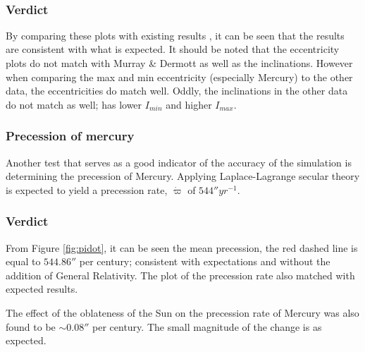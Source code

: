 \documentclass[11pt, oneside]{article}   	%
\begin{document}
\newpage
\ 
\newpage
\
\newpage

\subsubsection*{Verdict}

By comparing these plots with existing results \cite{ssd, texas}, it can be seen that the results are consistent with what is expected. It should be noted that the eccentricity plots do not match with Murray \& Dermott as well as the inclinations. However when comparing the max and min eccentricity (especially Mercury) to the other data\cite{texas}, the eccentricities do match well. Oddly, the inclinations in the other data\cite{texas} do not match as well; has lower $I_{min}$ and higher $I_{max}$.

\subsubsection{Precession of mercury}

Another test that serves as a good indicator of the accuracy of the simulation is determining the precession of Mercury. Applying Laplace-Lagrange secular theory is expected to yield a precession rate, $\dot{\varpi}$ of $544{}'' yr^{-1}$\cite{texas, PRMer}.

\subsubsection*{Verdict}

From Figure \ref{fig:pidot}, it can be seen the mean precession, the red dashed line is equal to $544.86{}''$ per century; consistent with expectations and without the addition of General Relativity. The plot of the precession rate also matched with expected results\cite{texas}.

The effect of the oblateness of the Sun on the precession rate of Mercury was also found to be $\sim 0.08{}''$ per century. The small magnitude of the change is as expected.
        
\end{document}
